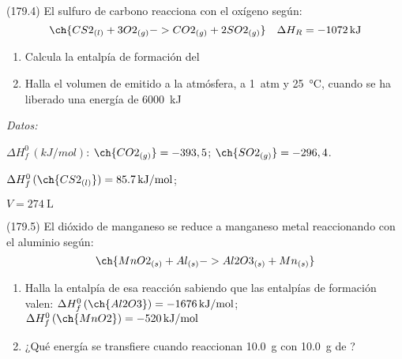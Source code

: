 \documentclass[10pt,a5paper,twoside]{article}
\newenvironment{gexdatos}{
      \vspace{4pt}
      \noindent\small\textit{Datos:}
    }{\vspace{5pt}}
\begin{document}
  \begin{exercise}[
      tags    = {},
      topics  = {química, termodinámica, termoquímica},
      source  = {FQ 1B MGH 2016, p179, e4},
    ]
    (179.4) El sulfuro de carbono reacciona con el oxígeno según:
     \[ \ch{CS2_{(l)} + 3 O2_{(g)} -> CO2_{(g)} + 2 SO2_{(g)}} \quad \Delta H_R = \SI{-1072}{kJ} \]
    \begin{enumerate}
      \item Calcula la entalpía de formación del 
      \item Halla el volumen de  emitido a la atmósfera, a \SI{1}{atm} y \SI{25}{\celsius}, cuando se ha liberado una energía de \SI{6000}{kJ}
    \end{enumerate}

    \begin{gexdatos}
      \( \Delta H^0_f\,(\si{kJ/mol}) \): \( \ch{CO2_{(g)}} = -393,5 \); \( \ch{SO2_{(g)}} = -296,4 \).
    \end{gexdatos}

  \end{exercise}

  \begin{solution}
    \begin{enumerate*}
      \item \( \Delta H^0_f\,(\ch{CS2_{(l)}}) = \SI{85.7}{kJ/mol} \); \item \( V = \SI{274}{\liter} \)
    \end{enumerate*}
  \end{solution}




  \begin{exercise}[
      tags    = {},
      topics  = {química, termodinámica, termoquímica},
      source  = {FQ 1B MGH 2016, p179, e5},
    ]
    (179.5) El dióxido de manganeso se reduce a manganeso metal reaccionando con el aluminio según:
    \[ \ch{MnO2_{(s)} + Al_{(s)} -> Al2O3_{(s)} + Mn_{(s)}} \]

    \begin{enumerate}
      \item Halla la entalpía de esa reacción sabiendo que las entalpías
      de formación valen:
      \( \Delta H^0_f\,(\ch{Al2O3}) = \SI{-1676}{kJ/mol} \); \( \Delta H^0_f\,(\ch{MnO2}) = \SI{-520}{kJ/mol} \)
      \item ¿Qué energía se transfiere cuando reaccionan \SI{10.0}{\gram}
       con \SI{10.0}{\gram} de ?
    \end{enumerate}
  \end{exercise}
\end{document}

